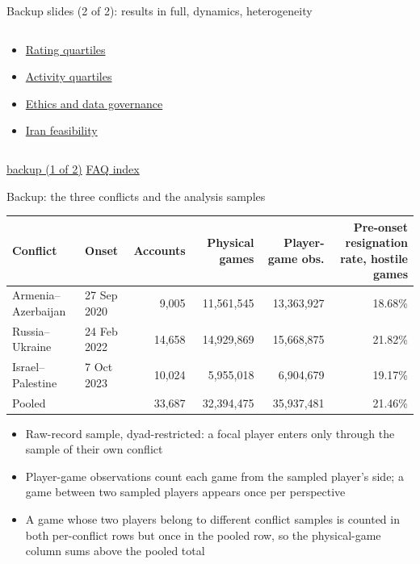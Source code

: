 \documentclass[aspectratio=169,11pt,t]{beamer}
\newcommand{\links}[1]{\vfill\hfill{#1}}
\begin{document}
\begin{frame}[label=backup-index2]{Backup slides (2 of 2): results in full, dynamics, heterogeneity}
\begin{columns}[T]
\begin{column}{0.5\textwidth}
\begin{itemize}
        \item \hyperlink{bk-rating}{Rating quartiles}
        \item \hyperlink{bk-activity}{Activity quartiles}
        \item \hyperlink{bk-ethics}{Ethics and data governance}
        \item \hyperlink{bk-iran}{Iran feasibility}
      \end{itemize}
    \end{column}
  \end{columns}
  \links{\hyperlink{backup-index}{\textcolor{linkblue}{\scriptsize\textsf{backup (1 of 2)}}} \quad \hyperlink{faq-index}{\textcolor{linkblue}{\scriptsize\textsf{FAQ index}}}}
\end{frame}

\begin{frame}[label=bk-table1-main]{Backup: the three conflicts and the analysis samples}
  \centering
  \footnotesize
  \setlength{\tabcolsep}{4pt}
  \begin{tabular}{@{}llrrrr@{}}
    \toprule
    Conflict & Onset & Accounts & Physical games & Player-game obs. & \shortstack[r]{Pre-onset resignation\\rate, hostile games} \\
    \midrule
    Armenia--Azerbaijan & 27 Sep 2020 & 9,005 & 11,561,545 & 13,363,927 & 18.68\% \\
    Russia--Ukraine & 24 Feb 2022 & 14,658 & 14,929,869 & 15,668,875 & 21.82\% \\
    Israel--Palestine & 7 Oct 2023 & 10,024 & 5,955,018 & 6,904,679 & 19.17\% \\
    \midrule
    Pooled & & 33,687 & 32,394,475 & 35,937,481 & 21.46\% \\
    \bottomrule
  \end{tabular}
  \vspace{2mm}
  \begin{flushleft}\footnotesize
    \begin{itemize}
      \item Raw-record sample, dyad-restricted: a focal player enters only through the sample of their own conflict
      \item Player-game observations count each game from the sampled player's side; a game between two sampled players appears once per perspective
      \item A game whose two players belong to different conflict samples is counted in both per-conflict rows but once in the pooled row, so the physical-game column sums above the pooled total

\end{itemize}
\end{flushleft}
\end{frame}
\end{document}
